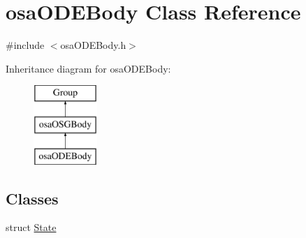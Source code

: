 \hypertarget{classosa_o_d_e_body}{}\section{osa\+O\+D\+E\+Body Class Reference}
\label{classosa_o_d_e_body}


{\ttfamily \#include $<$osa\+O\+D\+E\+Body.\+h$>$}

Inheritance diagram for osa\+O\+D\+E\+Body\+:\begin{figure}[H]
\begin{center}
\leavevmode
\includegraphics[height=3.000000cm]{dc/d68/classosa_o_d_e_body}
\end{center}
\end{figure}
\subsection*{Classes}
\begin{DoxyCompactItemize}
\item 
struct \hyperlink{structosa_o_d_e_body_1_1_state}{State}
\end{DoxyCompactItemize}
